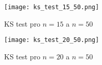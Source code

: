 \documentclass{article}
\begin{document}
\begin{figure}[h]
    \centering
    \texttt{[image: ks\_test\_15\_50.png]}
    \caption{KS test pro $n = 15$ a $n = 50$}
    \label{fig:ks_test_15_50}
\end{figure}

\begin{figure}[h]
    \centering
    \texttt{[image: ks\_test\_20\_50.png]}
    \caption{KS test pro $n = 20$ a $n = 50$}
    \label{fig:ks_test_20_50}
\end{figure}
\end{document}
